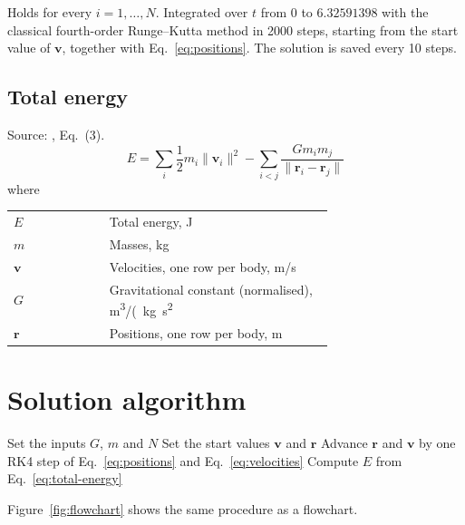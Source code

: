 \noindent Holds for every $i = 1, \dots, N$. Integrated over $t$ from $0$ to $6.32591398$ with the classical fourth-order Runge–Kutta method in 2000 steps, starting from the start value of $\mathbf{v}$, together with Eq.~\eqref{eq:positions}. The solution is saved every 10 steps.

\subsection{Total energy}
Source: \cite{ref}, Eq.~(3).
\begin{equation}
  E = \sum_i \frac{1}{2} m_i \|\mathbf{v}_i\|^2 - \sum_{i<j} \frac{G m_i m_j}{\|\mathbf{r}_i - \mathbf{r}_j\|}
  \label{eq:total-energy}
\end{equation}
\noindent where

\noindent\begin{tabular}{@{\quad}l@{\quad}p{0.7\linewidth}@{}}
  $E$ & Total energy, \si{J} \\
  $m$ & Masses, \si{kg} \\
  $\mathbf{v}$ & Velocities, one row per body, \si{m/s} \\
  $G$ & Gravitational constant (normalised), \si{m^{3}/(kg.s^{2}} \\
  $\mathbf{r}$ & Positions, one row per body, \si{m} \\
\end{tabular}


\section{Solution algorithm}
\begin{algorithm}[htbp]
  \caption{Solution procedure}\label{alg:solution}
  \begin{algorithmic}[1]
    \State Set the inputs $G$, $m$ and $N$
    \State Set the start values $\mathbf{v}$ and $\mathbf{r}$
     
      \State Advance $\mathbf{r}$ and $\mathbf{v}$ by one RK4 step of Eq.~\eqref{eq:positions} and Eq.~\eqref{eq:velocities}
    \EndFor
    \State Compute $E$ from Eq.~\eqref{eq:total-energy}
  \end{algorithmic}
\end{algorithm}

Figure~\ref{fig:flowchart} shows the same procedure as a flowchart.

